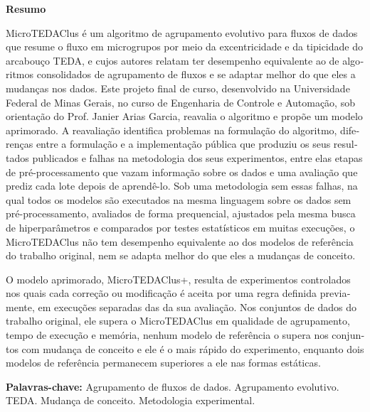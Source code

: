 
\begin{center}
\huge{{\bf Resumo}}
\vspace{1cm}
\end{center}

\begin{otherlanguage}{portuguese}
MicroTEDAClus é um algoritmo de agrupamento evolutivo para fluxos de dados que resume o fluxo em microgrupos por meio da excentricidade e da tipicidade do arcabouço TEDA, e cujos autores relatam ter desempenho equivalente ao de algoritmos consolidados de agrupamento de fluxos e se adaptar melhor do que eles a mudanças nos dados. Este projeto final de curso, desenvolvido na Universidade Federal de Minas Gerais, no curso de Engenharia de Controle e Automação, sob orientação do Prof. Janier Arias Garcia, reavalia o algoritmo e propõe um modelo aprimorado. A reavaliação identifica problemas na formulação do algoritmo, diferenças entre a formulação e a implementação pública que produziu os seus resultados publicados e falhas na metodologia dos seus experimentos, entre elas etapas de pré-processamento que vazam informação sobre os dados e uma avaliação que prediz cada lote depois de aprendê-lo. Sob uma metodologia sem essas falhas, na qual todos os modelos são executados na mesma linguagem sobre os dados sem pré-processamento, avaliados de forma prequencial, ajustados pela mesma busca de hiperparâmetros e comparados por testes estatísticos em muitas execuções, o MicroTEDAClus não tem desempenho equivalente ao dos modelos de referência do trabalho original, nem se adapta melhor do que eles a mudanças de conceito.

O modelo aprimorado, MicroTEDAClus+, resulta de experimentos controlados nos quais cada correção ou modificação é aceita por uma regra definida previamente, em execuções separadas das da sua avaliação. Nos conjuntos de dados do trabalho original, ele supera o MicroTEDAClus em qualidade de agrupamento, tempo de execução e memória, nenhum modelo de referência o supera nos conjuntos com mudança de conceito e ele é o mais rápido do experimento, enquanto dois modelos de referência permanecem superiores a ele nas formas estáticas.

\noindent\textbf{Palavras-chave:} Agrupamento de fluxos de dados. Agrupamento evolutivo. TEDA. Mudança de conceito. Metodologia experimental.
\end{otherlanguage}

\clearpage
\thispagestyle{empty}
\cleardoublepage
